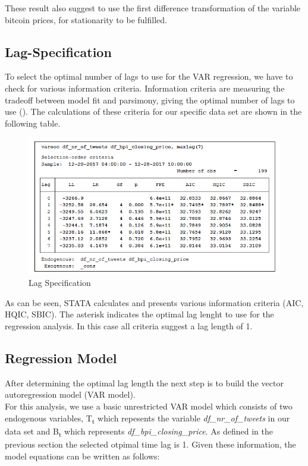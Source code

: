 \documentclass[a4paper,american,12pt]{article}
\begin{document}
\begin{spacing}{1.2}
These result also suggest to use the first difference transformation of the variable bitcoin prices, for stationarity to be fulfilled.

\subsection{Lag-Specification}
To select the optimal number of lags to use for the VAR regression, we have to check for various information criteria. Information criteria are measuring the tradeoff between model fit and parsimony, giving the optimal number of lags to use (\cite[p.~27]{brandtwilliams2007}). The calculations of these criteria for our specific data set are shown in the following table.\\

\begin{figure}[H]
\centering
\includegraphics[scale=0.85]{stata_export_graphs/LAG_crit_df_nr_tweets_df_bpi.png}
\caption{Lag Specification}
\label{fig:5}
\end{figure}

As can be seen, STATA calculates and presents various information criteria (AIC, HQIC, SBIC). The asterisk indicates the optimal lag lenght to use for the regression analysis. In this case all criteria suggest a lag length of 1.
		
\subsection{Regression Model}
After determining the optimal lag length the next step is to build the vector autoregression model (VAR model).\\
For this analysis, we use a basic unrestricted VAR model which consists of two endogenous variables, T\textsubscript t which repesents the variable {\itshape df\_nr\_of\_tweets} in our data set and B\textsubscript t which represents {\itshape df\_bpi\_closing\_price}. As defined in the previous section the selected otpimal time lag is 1. Given these information, the model equations can be written as follows:


\end{spacing}
\end{document}
